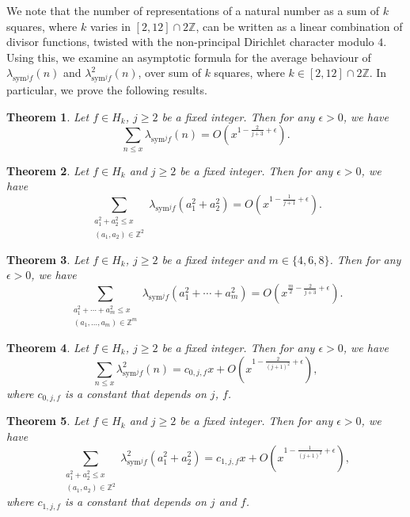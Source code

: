 \documentclass[10pt]{amsart}
\newtheorem{theorem}{Theorem}
\begin{document}
We note that the number of representations of a natural number as a sum of $k$ squares, where $k$ varies in $[2,12] \cap 2\mathbb{Z}$, can be written as a linear combination of divisor functions, twisted with the non-principal Dirichlet character modulo $4$. Using this, we examine an asymptotic formula for the average behaviour of $\lambda_{\mathrm{sym}^jf}(n)$ and $\lambda_{\mathrm{sym}^jf}^2(n)$, over sum of $k$ squares, where $k \in [2,12] \cap 2\mathbb{Z}$. In particular, we prove the following results. 
\begin{theorem} \label{thm:main(0)}
    Let $f \in H_k$, $j \geq 2$ be a fixed integer. Then for any $\epsilon > 0$, we have $$\sum_{n \leq x}\lambda_{\mathrm{sym}^jf}(n) = O\left( x^{1-\frac{2}{j+3}+\epsilon} \right).$$
\end{theorem}

\begin{theorem} \label{thm:main}
    Let $f \in H_k$ and $j \geq 2$ be a fixed integer. Then for any $\epsilon > 0$, we have $$\sum_{\substack{a_1^2+a_2^2 \leq x \\ (a_1,a_2) \in \mathbb{Z}^2}}\lambda_{\mathrm{sym}^jf}(a_{1}^{2}+a_2^2) = O \left( x^{1-\frac{1}{j+1}+\epsilon}\right).$$
\end{theorem}

\begin{theorem} \label{thm:main(468)}
    Let $f \in H_k$, $j \geq 2$ be a fixed integer and $ m \in \{4,6,8\}$. Then for any $\epsilon > 0$, we have $$\sum_{\substack{a_{1}^{2}+\cdots+a_{m}^{2} \leq x \\ (a_{1},\ldots,a_{m})\in\mathbb{Z}^{m}}}\lambda_{\mathrm{sym}^jf}(a_{1}^{2}+\cdots+a_{m}^{2}) = O\left( x^{\frac{m}{2}-\frac{2}{j+3}+\epsilon} \right).$$
\end{theorem}

\begin{theorem} \label{thm:main1(0)}
        Let $f \in H_k$, $j \geq 2$ be a fixed integer. Then for any $\epsilon > 0$, we have 
         $$\sum_{n \leq x}\lambda_{\mathrm{sym}^jf}^2(n) = c_{0,j,f}x + O\left( x^{1-\frac{2}{(j+1)^2}+\epsilon} \right),$$ where $c_{0,j,f}$ is a constant that depends on $j$, $f$.
\end{theorem}

\begin{theorem} \label{thm:main1}
    Let $f \in H_k$ and $j \geq 2$ be a fixed integer. Then for any $\epsilon > 0$, we have $$\sum_{\substack{a_1^2+a_2^2 \leq x \\ (a_1,a_2) \in \mathbb{Z}^2}}\lambda_{\mathrm{sym}^jf}^2(a_{1}^{2}+a_2^2) =c_{1,j,f}x+ O \left(x^{1-\frac{1}{(j+1)^2}+\epsilon}\right),$$  where $c_{1,j,f}$ is a constant that depends on $j$ and $f$.  
\end{theorem}
\end{document}
